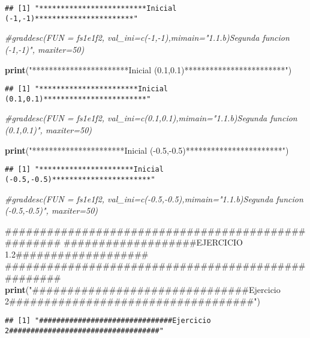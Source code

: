 \documentclass[]{article}
\newenvironment{Shaded}{\begin{snugshade}}{\end{snugshade}}
\newcommand{\KeywordTok}[1]{\textcolor[rgb]{0.13,0.29,0.53}{\textbf{{#1}}}}
\newcommand{\StringTok}[1]{\textcolor[rgb]{0.31,0.60,0.02}{{#1}}}
\newcommand{\CommentTok}[1]{\textcolor[rgb]{0.56,0.35,0.01}{\textit{{#1}}}}
\newcommand{\NormalTok}[1]{{#1}}
\begin{document}
\begin{verbatim}
## [1] "*************************Inicial (-1,-1)***********************"
\end{verbatim}

\begin{Shaded}
\begin{Highlighting}[]
\CommentTok{#graddesc(FUN = fs1e1f2, val_ini=c(-1,-1),mimain="1.1.b)Segunda funcion (-1,-1)", maxiter=50)}

\KeywordTok{print}\NormalTok{(}\StringTok{"***********************Inicial (0.1,0.1)************************"}\NormalTok{)}
\end{Highlighting}
\end{Shaded}

\begin{verbatim}
## [1] "***********************Inicial (0.1,0.1)************************"
\end{verbatim}

\begin{Shaded}
\begin{Highlighting}[]
\CommentTok{#graddesc(FUN = fs1e1f2, val_ini=c(0.1,0.1),mimain="1.1.b)Segunda funcion (0.1,0.1)", maxiter=50)}

\KeywordTok{print}\NormalTok{(}\StringTok{"**********************Inicial (-0.5,-0.5)***********************"}\NormalTok{)}
\end{Highlighting}
\end{Shaded}

\begin{verbatim}
## [1] "**********************Inicial (-0.5,-0.5)***********************"
\end{verbatim}

\begin{Shaded}
\begin{Highlighting}[]
\CommentTok{#graddesc(FUN = fs1e1f2, val_ini=c(-0.5,-0.5),mimain="1.1.b)Segunda funcion (-0.5,-0.5)", maxiter=50)}

\NormalTok{###################################################}
\NormalTok{###################EJERCICIO 1.2###################}
\NormalTok{###################################################}
\KeywordTok{print}\NormalTok{(}\StringTok{"###############################Ejercicio 2###################################"}\NormalTok{)}
\end{Highlighting}
\end{Shaded}

\begin{verbatim}
## [1] "###############################Ejercicio 2###################################"
\end{verbatim}
\end{document}
